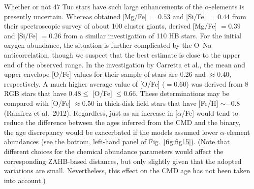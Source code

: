 \documentclass[12pt,preprint]{aastex}
\begin{document}
Whether or not 47 Tuc stars have such large enhancements of the
$\alpha$-elements is presently uncertain.  Whereas \citet{cgb13} obtained
[Mg/Fe] $= 0.53$ and [Si/Fe] $= 0.44$ from their spectroscopic survey of about
100 cluster giants, \citet{gls13} derived [Mg/Fe] $= 0.39$ and [Si/Fe] $=0.26$
from a similar investigation of 110 HB stars.  For the initial oxygen abundance,
the situation is further complicated by the O--Na anticorrelation, though we
suspect that the best estimate is close to the upper end of the observed range.
In the investigation by Carretta et al., the mean and upper envelope [O/Fe]
values for their sample of stars are 0.26 and $\approx 0.40$, respectively.  A 
much higher average value of [O/Fe] ($= 0.60$) was derived \citet{km08} from
8 RGB stars that have $0.48 \le$ [O/Fe] $\le 0.66$.  These determinations may be
compared with [O/Fe] $\approx 0.50$ in thick-disk field stars that have [Fe/H]
$\sim -0.8$ (Ram\'irez et al.~2012).  Regardless, just as an increase in
[$\alpha$/Fe] would tend to reduce the difference between the ages inferred
from the CMD and the binary, the age discrepancy would be exacerbated if the
models assumed lower $\alpha$-element abundances (see the bottom, left-hand
panel of Fig.~\ref{fig:fig15}).  (Note that different choices for the chemical
abundance parameters would affect the corresponding ZAHB-based distances, but
only slightly given that the adopted variations are small.  Nevertheless, this
effect on the CMD age has not been taken into account.) 
\end{document}

